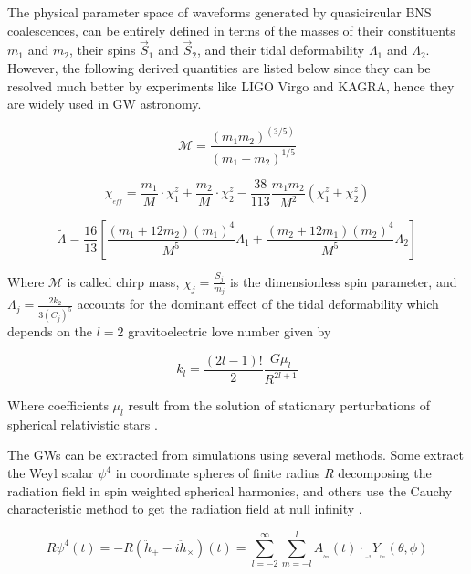 \FloatBarrier

The physical parameter space of waveforms generated by quasicircular BNS coalescences, can be entirely defined in terms of the masses of their constituents $m_1$ and $m_2$, their spins $\vec{S}_1$ and $\vec{S}_2$, and their tidal deformability $\Lambda_1$ and $\Lambda_2$\cite{Hinderer:2009ca}. However, the following derived quantities are listed below since they can be resolved much better by experiments like LIGO Virgo and KAGRA, hence they are widely used in GW astronomy.

\begin{equation}
\mathcal{M} = \frac{(m_1 m_2)^{(3/5)}}{(m_1 + m_2)^{1/5}}
\end{equation}

\begin{equation}\label{chieff}
\chi_{_{eff}} = \frac{m_1}{M}\cdot \chi_1^z + \frac{m_2}{M}\cdot \chi_2^z - \frac{38}{113} \frac{m_1 m_2}{M^2}(\chi_1^z + \chi_2^z)
\end{equation}


\begin{equation}
\tilde{\Lambda} = \frac{16}{13} \left[ \frac{(m_1 +12m_2)(m_1)^4}{M^5} \Lambda_1 + \frac{(m_2 +12m_1)(m_2)^4}{M^5} \Lambda_2 \right]
\end{equation}

Where $\mathcal{M}$ is called chirp mass, $\chi_j = \frac{S_j}{m_j}$ is the dimensionless spin parameter, and $\Lambda_j = \frac{2k_2}{3(C_j)^5}$ accounts for the dominant effect of the tidal deformability  which depends on the $l=2$ gravitoelectric love number given by

\begin{equation}
k_l = \frac{(2l-1)!}{2}\frac{G \mu_l}{R^{2l+1}}
\end{equation}

Where coefficients $\mu_l$ result from the solution of stationary perturbations of spherical relativistic stars \cite{PhysRevD.80.084035,PhysRevD.80.084018,PhysRevD.77.021502,2020GReGr..52..108B}.

The GWs can be extracted from simulations using several methods. Some extract the Weyl scalar $\psi^4$ in coordinate spheres of finite radius $R$ \cite{Bishop:2016lgv,Thorne:1980ru} decomposing the radiation field in spin weighted spherical harmonics, and others use the Cauchy characteristic method to get the radiation field at null infinity \cite{Barkett:2019uae}.

\begin{equation}\label{pso}
R\psi^4(t) = - R(\ddot{h}_+ - i\ddot{h}_\times)(t) = \sum_{l=-2}^{\infty}  \sum_{m=-l}^{l} A_{_{_{lm}}}(t) \cdot {}_{_{_{-2}}}Y_{_{_{lm}}}(\theta, \phi)
\end{equation}


